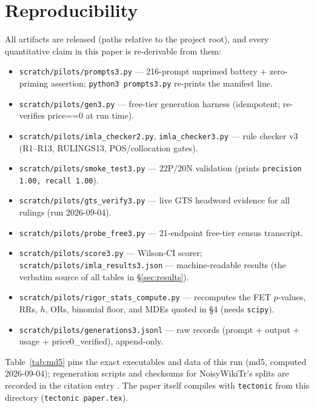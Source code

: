 \documentclass[11pt]{article}
\begin{document}
\section{Reproducibility}

All artifacts are released (paths relative to the project root), and every quantitative claim in this paper is re-derivable from them:

\begin{itemize}
\item \texttt{scratch/pilots/prompts3.py} --- 216-prompt unprimed battery + zero-priming assertion; \texttt{python3 prompts3.py} re-prints the manifest line.
\item \texttt{scratch/pilots/gen3.py} --- free-tier generation harness (idempotent; re-verifies price==0 at run time).
\item \texttt{scratch/pilots/imla\_checker2.py}, \texttt{imla\_checker3.py} --- rule checker v3 (R1--R13, RULINGS13, POS/collocation gates).
\item \texttt{scratch/pilots/smoke\_test3.py} --- 22P/20N validation (prints \texttt{precision 1.00, recall 1.00}).
\item \texttt{scratch/pilots/gts\_verify3.py} --- live GTS headword evidence for all rulings (run 2026-09-04).
\item \texttt{scratch/pilots/probe\_free3.py} --- 21-endpoint free-tier census transcript.
\item \texttt{scratch/pilots/score3.py} --- Wilson-CI scorer; \texttt{scratch/pilots/imla\_results3.json} --- machine-readable results (the verbatim source of all tables in \S\ref{sec:results}).
\item \texttt{scratch/}\allowbreak\texttt{pilots/}\allowbreak\texttt{rigor\_stats\_compute.py} --- recomputes the FET $p$-values, RRs, $h$, ORs, binomial floor, and MDEs quoted in \S4 (needs \texttt{scipy}).
\item \texttt{scratch/pilots/generations3.jsonl} --- raw records (prompt + output + usage + price0\_verified), append-only.
\end{itemize}

Table~\ref{tab:md5} pins the exact executables and data of this run (md5, computed 2026-09-04); regeneration scripts and checksums for NoisyWikiTr's splits are recorded in the citation entry \cite{noisywiki2025}. The paper itself compiles with \texttt{tectonic} from this directory (\texttt{tectonic paper.tex}).
\end{document}
